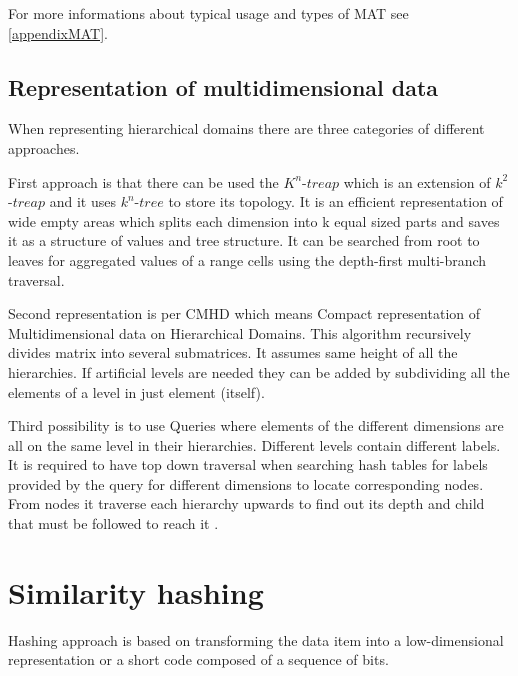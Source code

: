 
For more informations about typical usage and types of MAT see \ref{appendixMAT}.


\subsection{Representation of multidimensional data}\label{represOfMultidimData}
When representing hierarchical domains there are three categories of different approaches.

First approach is that there can be used the $K^n$-$treap$ which is an extension of $k^2$-$treap$ and it uses $k^n$-$tree$ to store its topology. It is an efficient representation of wide empty areas which splits each dimension into k equal sized parts and saves it as a structure of values and tree structure. It can be searched from root to leaves for aggregated values of a range cells using the depth-first multi-branch traversal.

Second representation is per CMHD which means Compact representation of Multidimensional data on Hierarchical Domains. This algorithm recursively divides matrix into several submatrices. It assumes same height of all the hierarchies. If artificial levels are needed they can be added by subdividing all the elements of a level in just element (itself).

Third possibility is to use Queries where elements of the different dimensions are all on the same level in their hierarchies. Different levels contain different labels. It is required to have top down traversal when searching hash tables for labels provided by the query for different dimensions to locate corresponding nodes. From nodes it traverse each hierarchy upwards to find out its depth and child that must be followed to reach it \cite{efficientRepre}.

\section{Similarity hashing}\label{similHashing}
Hashing approach is based on transforming the data item into a low-dimensional representation or a short code composed of a sequence of bits.

